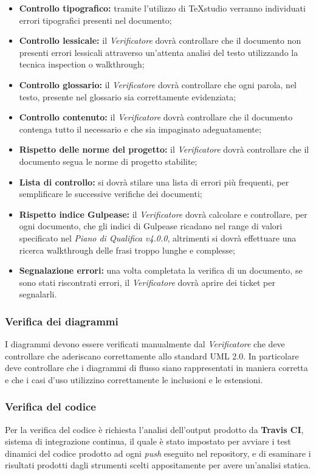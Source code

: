 \begin{itemize}
	\item \textbf{Controllo tipografico: }tramite l'utilizzo di TeXstudio verranno individuati errori tipografici presenti nel documento;
	\item \textbf{Controllo lessicale: }il \textit{Verificatore} dovrà controllare che il documento non presenti errori lessicali attraverso un'attenta analisi del testo utilizzando la tecnica \gls{inspection} o \gls{walkthrough};
	\item \textbf{Controllo glossario: }il \textit{Verificatore} dovrà controllare che ogni parola, nel testo, presente nel glossario sia correttamente evidenziata;
	\item \textbf{Controllo contenuto: }il \textit{Verificatore} dovrà controllare che il documento contenga tutto il necessario e che sia impaginato adeguatamente;
	\item \textbf{Rispetto delle norme del progetto: }il \textit{Verificatore} dovrà controllare che il documento segua le norme di progetto stabilite;
	\item \textbf{Lista di controllo: }si dovrà stilare una lista di errori più frequenti, per semplificare le successive verifiche dei documenti;
	\item \textbf{Rispetto \gls{indice Gulpease}: }il \textit{Verificatore} dovrà calcolare e controllare, per ogni documento, che gli \gls{indici di Gulpease} ricadano nel range di valori specificato nel \textit{Piano di Qualifica v4.0.0}, altrimenti si dovrà effettuare una ricerca \gls{walkthrough} delle frasi troppo lunghe e complesse;
	\item \textbf{Segnalazione errori: }una volta completata la verifica di un documento, se sono stati riscontrati errori, il \textit{Verificatore} dovrà aprire dei \gls{ticket} per segnalarli.
\end{itemize}
	
\subsubsection{Verifica dei diagrammi}
I diagrammi devono essere verificati manualmente dal \textit{Verificatore} che deve controllare che aderiscano correttamente allo standard \gls{UML} 2.0.
In particolare deve controllare che i diagrammi di flusso siano rappresentati in maniera corretta e che i \gls{casi d'uso} utilizzino correttamente le inclusioni e le estensioni.

\subsubsection{Verifica del codice}
Per la verifica del codice è richiesta l'analisi dell'output prodotto da \textbf{Travis CI}, sistema di integrazione continua, il quale è stato impostato per avviare i test dinamici del codice prodotto ad ogni \textit{push} eseguito nel \gls{repository}, e di esaminare i risultati prodotti dagli strumenti scelti appositamente per avere un'analisi statica.

